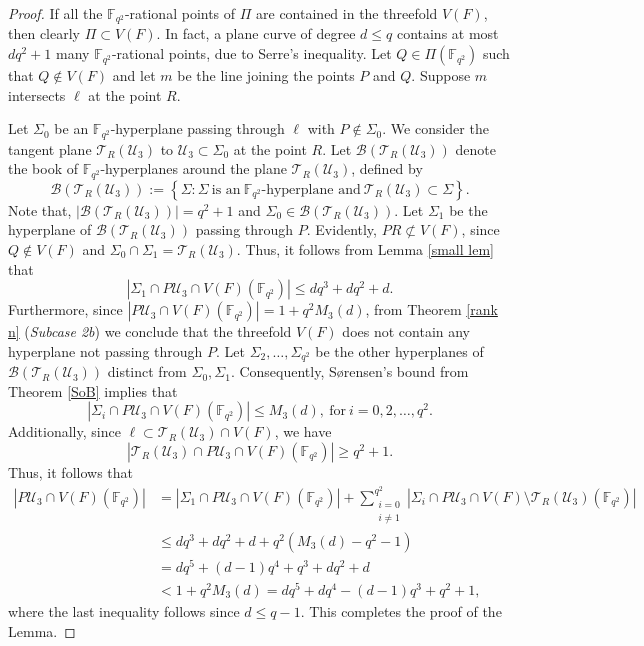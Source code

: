 \documentclass[10pt,a4paper,oneside]{amsproc}
\newcommand{\B}{\mathcal{B}}
\newcommand{\Fqt}{\mathbb{F}_{q^2}}
\newcommand{\U}{\mathcal{U}}
\newcommand{\T}{\mathcal{T}}
\begin{document}
\begin{proof}
If all the $\Fqt$-rational points of $\Pi$ are contained in the threefold $V(F)$, then clearly $\Pi\subset V(F)$. In fact, a plane curve of degree $d\leq q$ contains at most $dq^2+1$ many $\Fqt$-rational points, due to Serre's inequality. Let $Q\in \Pi(\Fqt)$ such that $Q\notin V(F)$ and let $m$ be the line joining the points $P$ and $Q$. Suppose $m$ intersects $\ell$ at the point $R$. 

Let $\Sigma_0$ be an $\Fqt$-hyperplane passing through $\ell$ with $P\notin \Sigma_0$. We consider the tangent plane $\T_R(\U_3)$ to $\U_3\subset \Sigma_0$ at the point $R$. Let $\B\left(\T_R(\U_3)\right)$ denote the book of $\Fqt$-hyperplanes around the plane $\T_R(\U_3)$, defined by $$\B\left(\T_R(\U_3)\right):=\left\{ \Sigma: \Sigma \ \text{is an} \ \Fqt\text{-hyperplane and}\ \T_R(\U_3)\subset \Sigma\right\}.$$ Note that, $|\B\left(\T_R(\U_3)\right)|=q^2+1$ and $\Sigma_0\in \B\left(\T_R(\U_3)\right)$. Let $\Sigma_1$ be the hyperplane of $\B\left(\T_R(\U_3)\right)$ passing through $P$. Evidently, $PR\not \subset V(F)$, since $Q\notin V(F)$ and $\Sigma_0\cap\Sigma_1=\T_R(\U_3)$. Thus, it follows from Lemma \ref{small lem} that $$|\Sigma_1\cap P\U_3\cap V(F)(\Fqt)|\leq dq^3+dq^2+d.$$ Furthermore, since $|P\U_3\cap V(F)(\Fqt)|=1+q^2M_3(d)$, from Theorem \ref{rank n} (\textit{Subcase 2b}) we conclude that the threefold $V(F)$ does not contain any hyperplane not passing through $P$. Let $\Sigma_2,\dots,\Sigma_{q^2}$ be the other hyperplanes of $\B(\T_R(\U_3))$ distinct from $\Sigma_0,\Sigma_1$.  Consequently, S{\o}rensen's bound from Theorem \ref{SoB} implies that $$|\Sigma_i\cap P\U_3\cap V(F)(\Fqt)|\leq M_3(d),\ \text{for}\ i=0,2,\dots,q^2.$$  Additionally, since $\ell\subset \T_R(\U_3)\cap V(F)$, we have $$|\T_R(\U_3)\cap P\U_3\cap V(F)(\Fqt)|\geq q^2+1.$$ Thus, it follows that 
\begin{align*}
    |P\U_3\cap V(F)(\Fqt)|&=|\Sigma_1\cap P\U_3\cap V(F)(\Fqt)|+\sum_{\substack{i=0 \\ i\neq 1}}^{q^2}|\Sigma_i\cap P\U_3\cap V(F)\setminus \T_R(\U_3)(\Fqt)|\\
    &\leq dq^3+dq^2+d+q^2(M_3(d)-q^2-1)\\
    &= dq^5+(d-1)q^4+q^3+dq^2+d\\
    &< 1+q^2M_3(d)=dq^5+dq^4-(d-1)q^3+q^2+1,    
\end{align*} where the last inequality follows since $d\leq q-1$. This completes the proof of the Lemma.
\end{proof}
\end{document}
